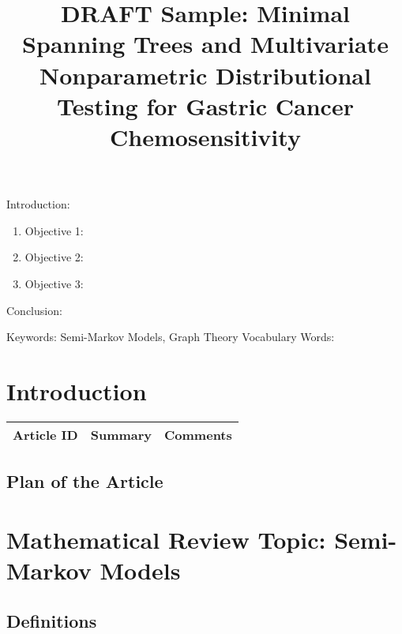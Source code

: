 
\twocolumn
\scriptsize
\begin{frontmatter}
		\title{DRAFT Sample: Minimal Spanning Trees and Multivariate Nonparametric Distributional Testing for Gastric Cancer Chemosensitivity}
		\author{}
		\address{The Mathematical Learning Space}
\end{frontmatter}	

Introduction:
\begin{enumerate}
\item Objective 1:
\item Objective 2:
\item Objective 3:
\end{enumerate}
Conclusion:

Keywords: Semi-Markov Models, Graph Theory
Vocabulary Words:

\section{Introduction}

\begin{table}[H]\centering
	\begin{tabular}{p{1cm}p{4cm}p{3cm}}
		Article ID & Summary & Comments\\
		\hline
		\hline
	\end{tabular}
\end{table}

\subsection{Plan of the Article}

\begin{enumerate}
\end{enumerate}

\section{Mathematical Review Topic: Semi-Markov Models}

\subsection{Definitions}

